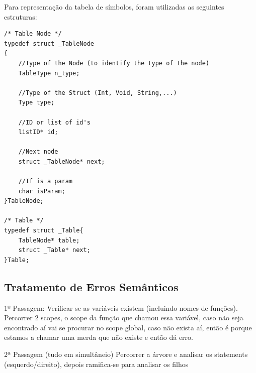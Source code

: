 \documentclass[12pt]{article}
\begin{document}
Para representação da tabela de símbolos, foram utilizadas as seguintes estruturas:
\begin{lstlisting}
/* Table Node */
typedef struct _TableNode
{
    //Type of the Node (to identify the type of the node)
    TableType n_type;
    
    //Type of the Struct (Int, Void, String,...)
    Type type;
    
    //ID or list of id's
    listID* id;
    
    //Next node
    struct _TableNode* next;
    
    //If is a param
    char isParam;
}TableNode;

/* Table */
typedef struct _Table{
    TableNode* table;
    struct _Table* next;
}Table;

\end{lstlisting}



\subsection{Tratamento de Erros Semânticos}
1º Passagem:
Verificar se as variáveis existem (incluindo nomes de funções). Percorrer 2 scopes, o scope da função que chamou essa variável, caso não seja encontrado aí vai se procurar no scope global, caso não exista aí, então é porque estamos a chamar uma merda que não existe  e então dá erro.

2ª Passagem (tudo em simultâneio)
Percorrer a árvore e analisar os statements (esquerdo/direito), depois ramifica-se para analisar os filhos






	
	
\end{document}
